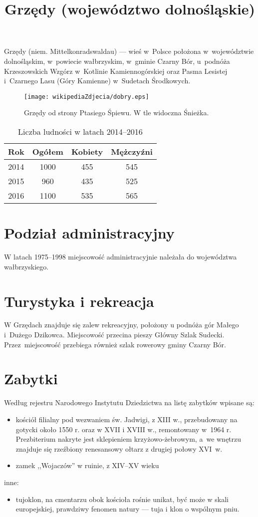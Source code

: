 \documentclass[a4paper,12pt]{article}
\title{Grzędy (województwo dolnośląskie)}
\author{}
\begin{document}
\maketitle
Grzędy (niem. Mittelkonradswaldau) --- wieś w~Polsce położona w~województwie dolnośląskim, w~powiecie wałbrzyskim, w~gminie Czarny Bór, u~podnóża Krzeszowskich Wzgórz w~Kotlinie Kamiennogórskiej oraz Pasma Lesistej i~Czarnego Lasu (Góry Kamienne) w~Sudetach Środkowych.
\begin{figure}
\begin{center}
\texttt{[image: wikipediaZdjecia/dobry.eps]}
\caption{Grzędy od strony Ptasiego Śpiewu. W tle widoczna Śnieżka.}
\end{center}
\end{figure}

\begin{table}
\begin{tabular}{cccc}
\hline
\textbf{Rok}&\textbf{Ogółem}&\textbf{Kobiety}&\textbf{Mężczyźni}\\
\hline
2014&1000&455&545\\
2015&960&435&525\\
2016&1100&535&565\\
\end{tabular}
\caption{Liczba ludności w latach 2014--2016}
\end{table}

\tableofcontents

\section{Podział administracyjny}
W latach 1975--1998 miejscowość administracyjnie należała do województwa wałbrzyskiego.
\section{Turystyka i rekreacja}
W Grzędach znajduje się zalew rekreacyjny, położony u podnóża gór Małego i~Dużego Dzikowca. Miejscowość przecina pieszy Główny Szlak Sudecki. Przez~miejscowość przebiega również szlak rowerowy gminy Czarny Bór.
\section{Zabytki}
Według rejestru Narodowego Instytutu Dziedzictwa na listę zabytków wpisane są:
\begin{itemize}
\item kościół filialny pod wezwaniem św. Jadwigi, z XIII w., przebudowany na gotycki około 1550 r. oraz w XVII i XVIII w., remontowany w~1964 r. 
Prezbiterium nakryte jest sklepieniem krzyżowo-żebrowym, a~we wnętrzu znajduje się rzeźbiony renesansowy ołtarz z drugiej połowy XVI~w.
\item zamek ,,Wojaczów'' w ruinie, z XIV--XV wieku
\end{itemize}
inne:
\begin{itemize}
\item tujoklon, na cmentarzu obok kościoła rośnie unikat, być może w skali europejskiej, prawdziwy fenomen natury --- tuja i klon o wspólnym pniu.
\end{itemize}
\end{document}
